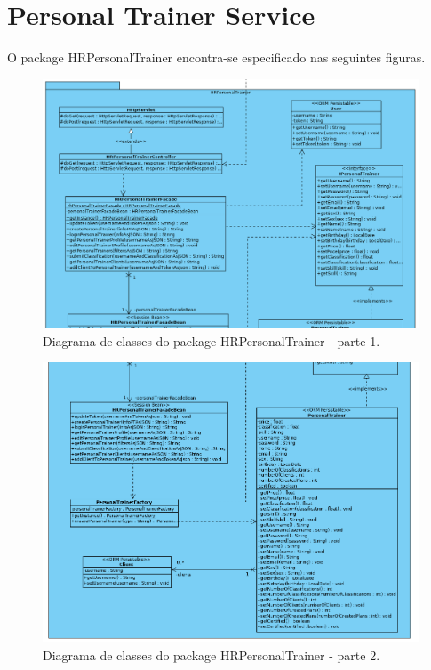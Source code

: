 \section{Personal Trainer Service}

\hspace{5mm} O package HRPersonalTrainer encontra-se especificado nas seguintes figuras.

\begin{figure}[H]
    \centering
    \includegraphics[scale=0.45]{images/arquitetura/pt-package-1.png}
    \caption{Diagrama de classes do package HRPersonalTrainer - parte 1.}
    \label{fig:interfaceperfilptbycliente}
\end{figure}


\begin{figure}[H]
    \centering
    \includegraphics[scale=0.5]{images/arquitetura/pt-package-2.png}
    \caption{Diagrama de classes do package HRPersonalTrainer - parte 2.}
    \label{fig:interfaceperfilptbycliente}
\end{figure}

